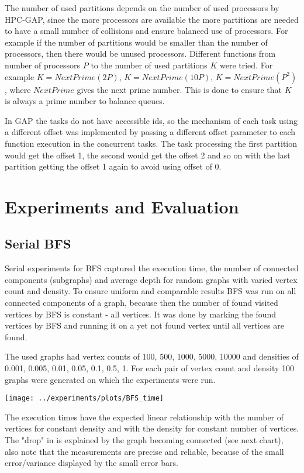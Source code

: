 \documentclass{report}
\theoremstyle{plain}
\theoremstyle{definition}
\theoremstyle{remark}
\begin{document}
The number of used partitions depends on the number of used processors by HPC-GAP, since the more processors are available the more partitions are needed to have a small number of collisions and ensure balanced use of processors. For example if the number of partitions would be smaller than the number of processors, then there would be unused processors. Different functions from number of processors $P$ to the number of used partitions $K$ were tried. For example $K=NextPrime(2P)$, $K=NextPrime(10P)$, $K=NextPrime(P^2)$, where $NextPrime$ gives the next prime number. This is done to ensure that $K$ is always a prime number to balance queues.

In GAP the tasks do not have accessible ids, so the mechanism of each task using a different offset was implemented by passing a different offset parameter to each function execution in the concurrent tasks. The task processing the first partition would get the offset 1, the second would get the offset 2 and so on with the last partition getting the offset 1 again to avoid using offset of 0.

\section{Experiments and Evaluation}

\subsection{Serial BFS}

Serial experiments for BFS captured the execution time, the number of connected components (subgraphs) and average depth for random graphs with varied vertex count and density. To ensure uniform and comparable results BFS was run on all connected components of a graph, because then the number of found visited vertices by BFS is constant - all vertices. It was done by marking the found vertices by BFS and running it on a yet not found vertex until all vertices are found.

 The used graphs had vertex counts of 100, 500, 1000, 5000, 10000 and densities of 0.001, 0.005, 0.01, 0.05, 0.1, 0.5, 1. For each pair of vertex count and density 100 graphs were generated on which the experiments were run.

\texttt{[image: ../experiments/plots/BFS\_time]}

The execution times have the expected linear relationship with the number of vertices for constant density and with the density for constant number of vertices. The "drop" in 
is explained by the graph becoming connected (see next chart), also note that the measurements are precise and reliable, because of the small error/variance displayed by the small error bars.
\end{document}
